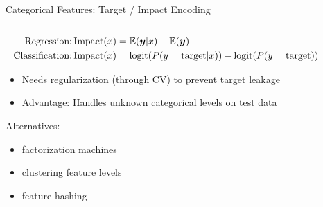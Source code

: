 \begin{frame}{Categorical Features: Target / Impact Encoding}
\begin{columns}
\begin{column}{0.7\textwidth}
      \vspace*{-0.5cm}  
      {\footnotesize
      \begin{align*}
      \text{Regression:} \operatorname{Impact}(x) &= \operatorname*{\mathbb{E}}(\bm{y} | x) - \operatorname*{\mathbb{E}}(\bm{y}) \\
      \text{Classification:} \operatorname{Impact}(x) &= \operatorname{logit}(P( y = \text{target} | x)) - \operatorname{logit}(P( y = \text{target}))
      \end{align*}
      }
      \vspace*{-0.5cm}  
      \begin{itemize}
        \item Needs regularization (through CV) to prevent target leakage 
        \item Advantage: Handles unknown categorical levels on test data
      \end{itemize}
      Alternatives: 
      \begin{itemize}
    \item factorization machines 
    \item clustering feature levels 
    \item feature hashing
      \end{itemize}
    \end{column}%
    \begin{column}{0.3\textwidth}
      \vspace{-1cm}
      \begin{center}
\end{center}
\end{column}
\end{columns}
\end{frame}
